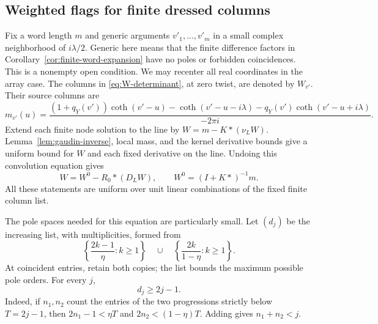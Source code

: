 \subsection{Weighted flags for finite dressed columns}

Fix a word length $m$ and generic arguments $v'_1,\ldots,v'_m$
in a small complex neighborhood of $i\lambda/2$.  Generic here
means that the finite difference factors in
Corollary~\ref{cor:finite-word-expansion} have no poles or forbidden
coincidences.  This is a nonempty open condition.
We may recenter all real coordinates in the array case.
The columns in \eqref{eq:W-determinant}, at zero twist, are denoted
by $W_{v'}$.  Their source columns are
\begin{equation}\label{eq:thermodynamic-source-column}
 m_{v'}(u)=
 \frac{(1+q_Y(v'))\coth(v'-u)-\coth(v'-u-i\lambda)
                       -q_Y(v')\coth(v'-u+i\lambda)}
      {-2\pi i}.
\end{equation}
Extend each finite node solution to the line by
$W=m-K*(\nu_LW)$.  Lemma~\ref{lem:gaudin-inverse}, local mass,
and the kernel derivative bounds give a uniform bound for $W$
and each fixed derivative on the line.  Undoing this convolution
equation gives
\begin{equation}\label{eq:finite-dressing-equation}
 W=W^0-R_0*(D_LW),\qquad W^0=(I+K*)^{-1}m.
\end{equation}
All these statements are uniform over unit linear combinations
of the fixed finite column list.

The pole spaces needed for this equation are particularly small.
Let $(d_j)$ be the increasing list, with multiplicities, formed
from
\begin{equation}\label{eq:decay-pole-list}
 \left\{\frac{2k-1}{\eta}:k\ge1\right\}
 \quad\cup\quad
 \left\{\frac{2k}{1-\eta}:k\ge1\right\}.
\end{equation}
At coincident entries, retain both copies; the list bounds the
maximum possible pole orders.  For every $j$,
\begin{equation}\label{eq:pole-count}
 d_j\ge2j-1.
\end{equation}
Indeed, if $n_1,n_2$ count the entries of the two progressions
strictly below $T=2j-1$, then
$2n_1-1<\eta T$ and $2n_2<(1-\eta)T$.
Adding gives $n_1+n_2<j$.

